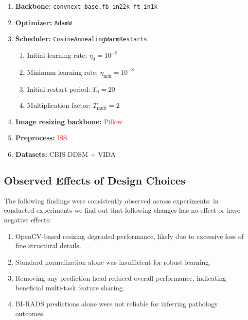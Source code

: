 \documentclass[11pt,a4paper]{article}
\begin{document}
\begin{enumerate}
    \item \textbf{Backbone:} \texttt{convnext\_base.fb\_in22k\_ft\_in1k}
    
    \item \textbf{Optimizer:} \texttt{AdamW}
    
    \item \textbf{Scheduler:} \texttt{CosineAnnealingWarmRestarts}
    \begin{enumerate}
        \item Initial learning rate: $\eta_{0} = 10^{-5}$
        \item Minimum learning rate: $\eta_{\min} = 10^{-8}$
        \item Initial restart period: $T_{0} = 20$
        \item Multiplication factor: $T_{\text{mult}} = 2$
    \end{enumerate}
    
    \item \textbf{Image resizing backbone:} \textcolor{red}{Pillow}
    
    \item \textbf{Preprocess:} \textcolor{red}{ISS}
    
    \item \textbf{Datasets:} CBIS-DDSM + VIDA
\end{enumerate}

\subsection*{Observed Effects of Design Choices} The following findings were consistently observed across experiments:
in conducted experiments we find out that following changes has no effect or have negative effects:

\begin{enumerate}
    \item OpenCV-based resizing degraded performance, likely due to excessive loss of fine structural details. 
    \item Standard normalization alone was insufficient for robust learning. 
    \item Removing any prediction head reduced overall performance, indicating beneficial multi-task feature sharing. 
    \item BI-RADS predictions alone were not reliable for inferring pathology outcomes. 
\end{enumerate}
\end{document}
